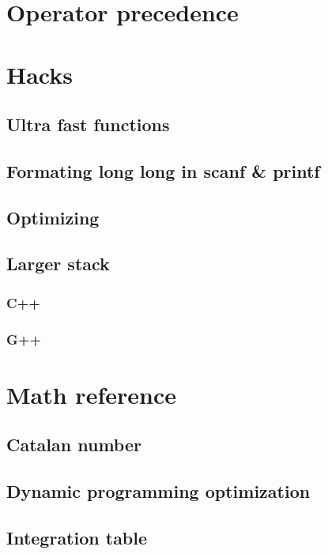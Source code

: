 \documentclass[UTF8,a4paper]{report}
\begin{document}
		\section{Operator precedence}
			
		\section{Hacks}
			\subsection{Ultra fast functions}
				
			\subsection{Formating long long in scanf \& printf}
				
			\subsection{Optimizing}
				
			\subsection{Larger stack}
				\subsubsection{C++}
					
				\subsubsection{G++}
					
		\section{Math reference}
			\subsection{Catalan number}
				
			\subsection{Dynamic programming optimization}
				
			\subsection{Integration table}
				
\end{document}

